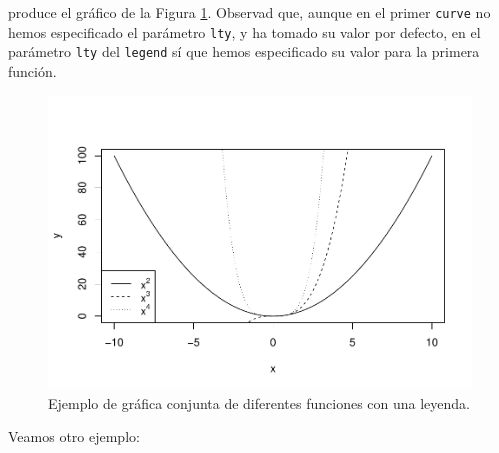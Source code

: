 \documentclass[
]{book}
\theoremstyle{definition}
\theoremstyle{definition}
\theoremstyle{definition}
\theoremstyle{remark}
\begin{document}
produce el gráfico de la Figura \ref{fig:mons21}. Observad que, aunque en el primer \texttt{curve} no hemos especificado el parámetro \texttt{lty}, y ha tomado su valor por defecto, en el parámetro \texttt{lty} del \texttt{legend} sí que hemos especificado su valor para la primera función.

\begin{figure}

{\centering \includegraphics[width=0.9\linewidth]{07chap06_Graficos_I_files/figure-latex/mons21-1} 

}

\caption{Ejemplo de gráfica conjunta de diferentes funciones con una leyenda.}\label{fig:mons21}
\end{figure}

Veamos otro ejemplo:
\end{document}

